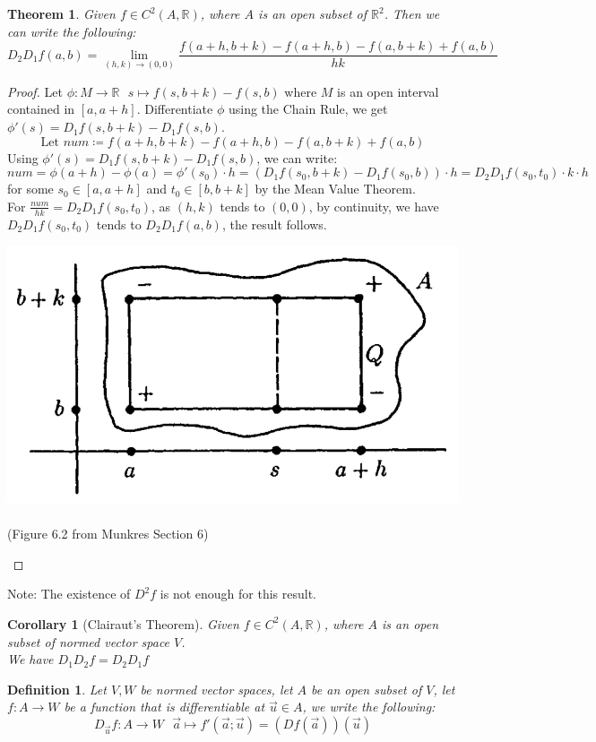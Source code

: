 \documentclass[15pt]{book}
\theoremstyle{break}
\theoremstyle{break}
\newtheorem{thm}{Theorem}[section]
\newtheorem{corT}[lem]{Corollary}
\newtheorem{defn}{Definition}[corL]
\newcommand{\R}{\mathbb{R}}
\newcommand{\note}{\color{red}Note: \color{black}}
\begin{document}
\begin{thm}
Given $f\in C^2(A,\R)$, where $A$ is an open subset of $\R^2$. Then we can write the following: $$D_2D_1f(a,b) = \lim_{(h,k)\to (0,0)} \frac{f(a+h,b+k)-f(a+h,b)-f(a,b+k)+f(a,b)}{hk}$$
\end{thm}
\begin{proof}
Let $\phi:M\to \R \ \ \ s\mapsto f(s,b+k)-f(s,b)$ where $M$ is an open interval contained in $[a,a+h]$. Differentiate $\phi$ using the Chain Rule, we get $\phi'(s) = D_1f(s,b+k) - D_1f(s,b)$. $$\text{Let }num \coloneqq f(a+h,b+k)-f(a+h,b)-f(a,b+k)+f(a,b)$$ Using $\phi'(s) = D_1f(s,b+k) - D_1f(s,b)$, we can write: $$num = \phi(a+h)-\phi(a) = \phi'(s_0)\cdot h = (D_1f(s_0,b+k) - D_1f(s_0,b))\cdot h = D_2D_1f(s_0,t_0)\cdot k \cdot h$$ for some $s_0 \in [a,a+h]$ and $t_0 \in [b, b+k]$ by the Mean Value Theorem. \\
For $\frac{num}{hk} = D_2D_1f(s_0,t_0)$, as $(h,k)$ tends to $(0,0)$, by continuity, we have $D_2D_1f(s_0,t_0)$ tends to $D_2D_1f(a,b)$, the result follows.
\begin{center}
\includegraphics[scale=0.39]{thm6_2.png}${}$\ \ \  \\
(Figure 6.2 from Munkres Section 6)
\end{center}
\end{proof}

\note The existence of $D^2f$ is not enough for this result.\\

\begin{corT}[Clairaut's Theorem]
Given $f\in C^2(A,\R)$, where $A$ is an open subset of normed vector space $V$.\\ We have $D_1D_2f = D_2D_1f$
\end{corT}

\begin{defn}
Let $V,W$ be normed vector spaces, let $A$ be an open subset of $V$, let $f :A \to W$ be a function that is differentiable at $\vec{u}\in A$, we write the following: 
$$D_{\vec{u}} f:A \to W\ \ \ \vec{a}\mapsto f'(\vec{a};\vec{u}) = (Df(\vec{a}))(\vec{u})$$
\end{defn}
\end{document}
